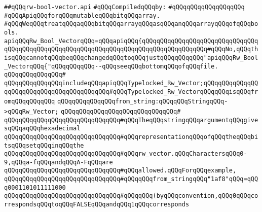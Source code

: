 \label{src/lib/src/rw-bool-vector.api}
\verb|##qQQqrw-bool-vector.api|\newline
\newline
\verb|#qQQqCompiledqQQqby:|\newline
\verb|#qQQqqQQqqQQqqQQqqQQq|\newline
\newline
\newline
\newline
\verb|#qQQqApiqQQqforqQQqmutableqQQqbitqQQqarray.|\newline
\verb|#qQQqWeqQQqtreatqQQqaqQQqbitqQQqarrayqQQqasqQQqanqQQqarrayqQQqofqQQqbools.|\newline
\newline
\newline
\verb|apiqQQqRw_Bool_VectorqQQq=qQQqapiqQQq{qQQqqQQqqQQqqQQqqQQqqQQqqQQqqQQqqQQqqQQqqQQqqQQqqQQqqQQqqQQqqQQqqQQqqQQqqQQqqQQqqQQqqQQq#qQQqNo,qQQqthisqQQqcannotqQQqbeqQQqchangedqQQqtoqQQqjustqQQqqQQqqQQq"apiqQQqRw_Bool_VectorqQQq{"qQQqqQQqqQQq--qQQqseeqQQqbottomqQQqofqQQqfile.|\newline
\verb|qQQqqQQqqQQqqQQq#|\newline
\verb|qQQqqQQqqQQqqQQqincludeqQQqapiqQQqTypelocked_Rw_Vector;qQQqqQQqqQQqqQQqqQQqqQQqqQQqqQQqqQQqqQQqqQQq#qQQqTypelocked_Rw_VectorqQQqqQQqisqQQqfromqQQqqQQqqQQq|\newline
\newline
\verb|qQQqqQQqqQQqqQQqfrom_string:qQQqqQQqStringqQQq->qQQqRw_Vector;|\newline
\verb|qQQqqQQqqQQqqQQqqQQqqQQqqQQqqQQq#|\newline
\verb|qQQqqQQqqQQqqQQqqQQqqQQqqQQqqQQq#qQQqTheqQQqstringqQQqargumentqQQqgivesqQQqaqQQqhexadecimal|\newline
\verb|qQQqqQQqqQQqqQQqqQQqqQQqqQQqqQQq#qQQqrepresentationqQQqofqQQqtheqQQqbitsqQQqsetqQQqinqQQqthe|\newline
\verb|qQQqqQQqqQQqqQQqqQQqqQQqqQQqqQQq#qQQqrw_vector.qQQqCharactersqQQq0-9,qQQqa-fqQQqandqQQqA-FqQQqare|\newline
\verb|qQQqqQQqqQQqqQQqqQQqqQQqqQQqqQQq#qQQqallowed.qQQqForqQQqexample,|\newline
\verb|qQQqqQQqqQQqqQQqqQQqqQQqqQQqqQQq#qQQqqQQqfrom_stringqQQq"1af8"qQQq=qQQq0001101011111000|\newline
\verb|qQQqqQQqqQQqqQQqqQQqqQQqqQQqqQQq#qQQqqQQq(byqQQqconvention,qQQq0qQQqcorrespondsqQQqtoqQQqFALSEqQQqandqQQq1qQQqcorresponds|\newline
